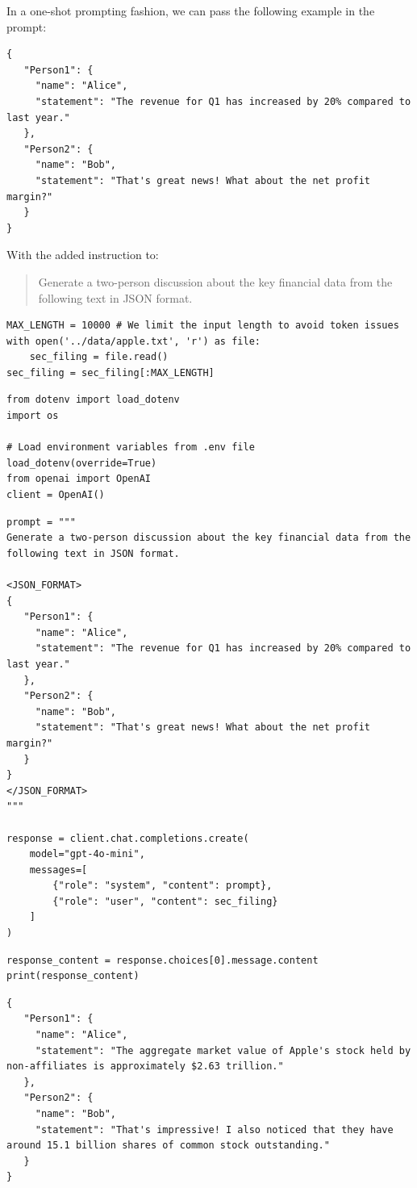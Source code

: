 In a one-shot prompting fashion, we can pass the following example in the prompt:
\begin{verbatim}
{
   "Person1": {
     "name": "Alice", 
     "statement": "The revenue for Q1 has increased by 20% compared to last year."
   },
   "Person2": {
     "name": "Bob",
     "statement": "That's great news! What about the net profit margin?"
   }
}
\end{verbatim}
With the added instruction to:

\begin{quote}
Generate a two-person discussion about the key financial data from the following text in JSON format.
\end{quote}

\begin{verbatim}
MAX_LENGTH = 10000 # We limit the input length to avoid token issues
with open('../data/apple.txt', 'r') as file:
    sec_filing = file.read()
sec_filing = sec_filing[:MAX_LENGTH] 
\end{verbatim}

\begin{verbatim}
from dotenv import load_dotenv
import os

# Load environment variables from .env file
load_dotenv(override=True)
from openai import OpenAI
client = OpenAI()
\end{verbatim}

\begin{verbatim}
prompt = """
Generate a two-person discussion about the key financial data from the following text in JSON format.

<JSON_FORMAT>
{
   "Person1": {
     "name": "Alice", 
     "statement": "The revenue for Q1 has increased by 20% compared to last year."
   },
   "Person2": {
     "name": "Bob",
     "statement": "That's great news! What about the net profit margin?"
   }
}
</JSON_FORMAT>
"""

response = client.chat.completions.create(
    model="gpt-4o-mini",
    messages=[
        {"role": "system", "content": prompt},
        {"role": "user", "content": sec_filing}
    ]
)
\end{verbatim}

\begin{verbatim}
response_content = response.choices[0].message.content
print(response_content)
\end{verbatim}

\begin{verbatim}
{
   "Person1": {
     "name": "Alice", 
     "statement": "The aggregate market value of Apple's stock held by non-affiliates is approximately $2.63 trillion."
   },
   "Person2": {
     "name": "Bob",
     "statement": "That's impressive! I also noticed that they have around 15.1 billion shares of common stock outstanding."
   }
}
\end{verbatim}

